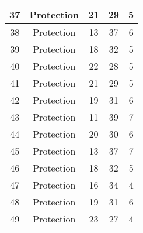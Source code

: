 \documentclass[results.tex]{subfiles}
\begin{document}
\begin{center}
\begin{tabular}{| c || c | c | c | c |}
            \hline
            37                      & Protection                   & 21                     & 29                      & 5                    \\
            \hline
            38                      & Protection                   & 13                     & 37                      & 6                    \\
            \hline
            39                      & Protection                   & 18                     & 32                      & 5                    \\
            \hline
            40                      & Protection                   & 22                     & 28                      & 5                    \\
            \hline
            41                      & Protection                   & 21                     & 29                      & 5                    \\
            \hline
            42                      & Protection                   & 19                     & 31                      & 6                    \\
            \hline
            43                      & Protection                   & 11                     & 39                      & 7                    \\
            \hline
            44                      & Protection                   & 20                     & 30                      & 6                    \\
            \hline
            45                      & Protection                   & 13                     & 37                      & 7                    \\
            \hline
            46                      & Protection                   & 18                     & 32                      & 5                    \\
            \hline
            47                      & Protection                   & 16                     & 34                      & 4                    \\
            \hline
            48                      & Protection                   & 19                     & 31                      & 6                    \\
            \hline
            49                      & Protection                   & 23                     & 27                      & 4                    \\
            \hline
        \end{tabular}
    \end{center}
\end{document}
